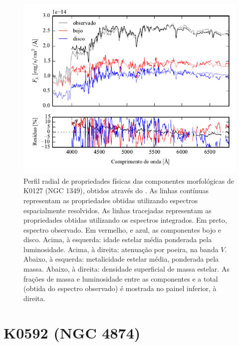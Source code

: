 \begin{figure}
	\includegraphics[page=4]{figuras/sample006a_synthesis}
	\caption[Propriedades físicas das componentes morfológicas de K0127 (NGC 1349)]
	{Perfil radial de propriedades físicas das componentes morfológicas de
	K0127 (NGC 1349), obtidos através do \starlight. As linhas contínuas
	representam as propriedades obtidas utilizando espectros espacialmente
	resolvidos. As linhas tracejadas representam as propriedades obtidas utilizando
	os espectros integrados. Em preto, espectro observado. Em vermelho, e azul, as
	componentes bojo e disco. Acima, à esquerda: idade estelar média ponderada pela
	luminosidade. Acima, à direita: atenuação por poeira, na banda $V$. Abaixo, à
	esquerda: metalicidade estelar média, ponderada pela massa. Abaixo, à direita:
	densidade superficial de massa estelar. As frações de massa e luminosidade
	entre as componentes e a total (obtida do espectro observado) é mostrada no
	painel inferior, à direita.}
	\label{fig:decompSinteseRadprof:K0127}
\end{figure}

\FloatBarrier


\section{K0592 (NGC 4874)}
\label{apendice:Decomp:K0592}

